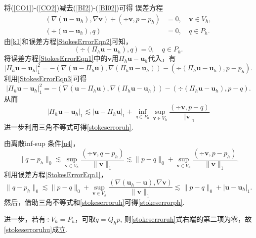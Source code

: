 \begin{prf}
将(\ref{CO1})-(\ref{CO2})减去(\ref{BI2})-(\ref{BI02})可得
误差方程
\begin{align}
(\nabla(\boldsymbol{u}-\boldsymbol{u}_h),\nabla\boldsymbol{v}) + (\div\boldsymbol{v},p-p_h) &=0,\quad \boldsymbol{v}\in   V_h,\label{StokesErrorEqn1}\\
(\div(\boldsymbol{u}-\boldsymbol{u}_h),q) &=0, \quad q\in P_h.\label{StokesErrorEqn2}
\end{align}
由\eqref{k1}和误差方程\eqref{StokesErrorEqn2}可知，
\begin{equation}
(\div(\Pi_h\boldsymbol{u}-\boldsymbol{u}_h),q) =0, \quad q\in P_h.\label{StokesErrorEqn3}
\end{equation}
将误差方程\eqref{StokesErrorEqn1}中的$\boldsymbol{v}$用$\Pi_{h}\boldsymbol{u}-\boldsymbol{u}_h$代入，有
\begin{equation*}
|\Pi_{h}\boldsymbol{u}-\boldsymbol{u}_h|_1^2=-(\nabla(\boldsymbol{u}-\Pi_{h}\boldsymbol{u}),\nabla(\Pi_{h}\boldsymbol{u}-\boldsymbol{u}_h))-(\div(\Pi_{h}\boldsymbol{u}-\boldsymbol{u}_h),p-p_h).
\end{equation*}
利用\eqref{StokesErrorEqn3}可得
\begin{equation*}
|\Pi_{h}\boldsymbol{u}-\boldsymbol{u}_h|_1^2=-(\nabla(\boldsymbol{u}-\Pi_{h}\boldsymbol{u}),\nabla(\Pi_{h}\boldsymbol{u}-\boldsymbol{u}_h))-(\div(\Pi_{h}\boldsymbol{u}-\boldsymbol{u}_h),p-q).
\end{equation*}
从而
\begin{equation*}
|\Pi_{h}\boldsymbol{u}-\boldsymbol{u}_h|_1\lesssim |\boldsymbol{u}-\Pi_{h}\boldsymbol{u}|_1 + \inf_{q\in P_h}\sup_{\boldsymbol{v}\in V_h}\frac{(\div\boldsymbol{v},p-q)}{|\boldsymbol{v}|_1}
\end{equation*}
进一步利用三角不等式可得\eqref{stokeserroruh}.

由离散inf-sup 条件\eqref{u4}，
\begin{equation*}
\|q-p_h\|_{0}\lesssim\sup _{\boldsymbol{v} \in  V_h}
\frac{(\div\boldsymbol{v}, q-p_h)}{\|\boldsymbol{v}\|_{1}}\lesssim \|p-q\|_0+\sup _{\boldsymbol{v} \in  V_h}
\frac{(\div\boldsymbol{v}, p-p_h)}{\|\boldsymbol{v}\|_{1}}.
\end{equation*}
利用误差方程\eqref{StokesErrorEqn1}，
\begin{equation*}
\|q-p_h\|_{0}\lesssim \|p-q\|_0+\sup _{\boldsymbol{v} \in  V_h}
\frac{(\nabla(\boldsymbol{u}_h-\boldsymbol{u}),\nabla\boldsymbol{v})}{\|\boldsymbol{v}\|_{1}}\lesssim \|p-q\|_0+|\boldsymbol{u}-\boldsymbol{u}_h|_1.
\end{equation*}
然后，借助三角不等式和\eqref{stokeserroruh}可得\eqref{stokeserrorph}.

进一步，若有$\div V_h=P_h$，可取$q=Q_hp$, 则\eqref{stokeserroruh}式右端的第二项为零，故\eqref{stokeserroruhu}成立.
\end{prf}

